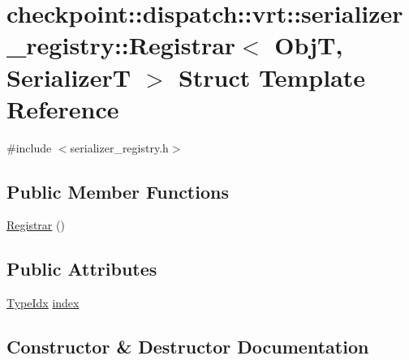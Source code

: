 \hypertarget{structcheckpoint_1_1dispatch_1_1vrt_1_1serializer__registry_1_1_registrar}{}\section{checkpoint\+:\+:dispatch\+:\+:vrt\+:\+:serializer\+\_\+registry\+:\+:Registrar$<$ ObjT, SerializerT $>$ Struct Template Reference}
\label{structcheckpoint_1_1dispatch_1_1vrt_1_1serializer__registry_1_1_registrar}


{\ttfamily \#include $<$serializer\+\_\+registry.\+h$>$}

\subsection*{Public Member Functions}
\begin{DoxyCompactItemize}
\item 
\hyperlink{structcheckpoint_1_1dispatch_1_1vrt_1_1serializer__registry_1_1_registrar_a56408855337dab32444d81a928f7fa51}{Registrar} ()
\end{DoxyCompactItemize}
\subsection*{Public Attributes}
\begin{DoxyCompactItemize}
\item 
\hyperlink{namespacecheckpoint_1_1dispatch_1_1vrt_acd3f9e6b091bcfbc23dc35ea8ef45d3b}{Type\+Idx} \hyperlink{structcheckpoint_1_1dispatch_1_1vrt_1_1serializer__registry_1_1_registrar_a1bd917516ca1cdcc553dd17bdf3c894f}{index}
\end{DoxyCompactItemize}


\subsection{Constructor \& Destructor Documentation}
\mbox{\label{structcheckpoint_1_1dispatch_1_1vrt_1_1serializer__registry_1_1_registrar_a56408855337dab32444d81a928f7fa51}} 
